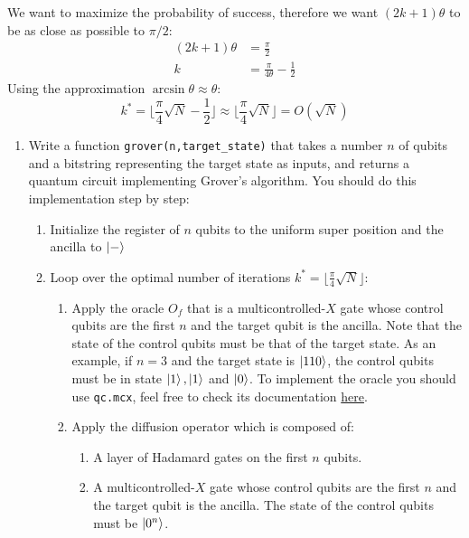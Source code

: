 \documentclass{article}
\begin{document}
We want to maximize the probability of success, therefore we want $(2k+1)\theta$ to be as close as possible to $\pi/2$:
\begin{equation*}
    \begin{split}
        (2k+1)\theta &= \frac{\pi}{2} \\
        k &= \frac{\pi}{4\theta}-\frac{1}{2}
    \end{split}
\end{equation*}
Using the approximation $\arcsin\theta\approx\theta$:
\begin{equation*}
    k^* = \lfloor \frac{\pi}{4}\sqrt{N}-\frac{1}{2}\rfloor\approx \lfloor \frac{\pi}{4}\sqrt{N}\rfloor=O(\sqrt{N})
\end{equation*}

\begin{enumerate}
    \item Write a function \verb|grover(n,target_state)| that takes a number $n$ of qubits and a bitstring representing the target state as inputs, and returns a quantum circuit implementing Grover's algorithm. You should do this implementation step by step:
    \begin{enumerate}
        \item Initialize the register of $n$ qubits to the uniform super position and the ancilla to $\ket{-}$
        \item Loop over the optimal number of iterations $k^*=\lfloor\frac{\pi}{4}\sqrt{N}\rfloor$:
        \begin{enumerate}
            \item Apply the oracle $O_f$ that is a multicontrolled-$X$ gate whose control qubits are the first $n$ and the target qubit is the ancilla. Note that the state of the control qubits must be that of the target state. As an example, if $n=3$ and the target state is $\ket{110}$, the control qubits must be in state $\ket{1},\ket{1}$ and $\ket{0}$. To implement the oracle you should use \verb|qc.mcx|, feel free to check its documentation \href{https://docs.quantum.ibm.com/api/qiskit/qiskit.circuit.library.MCXGate}{here}.
            \item Apply the diffusion operator which is composed of:
            \begin{enumerate}
                \item A layer of Hadamard gates on the first $n$ qubits.
                \item A multicontrolled-$X$ gate whose control qubits are the first $n$ and the target qubit is the ancilla. The state of the control qubits must be $\ket{0^n}$. 

\end{enumerate}
\end{enumerate}
\end{enumerate}
\end{enumerate}
\end{document}
